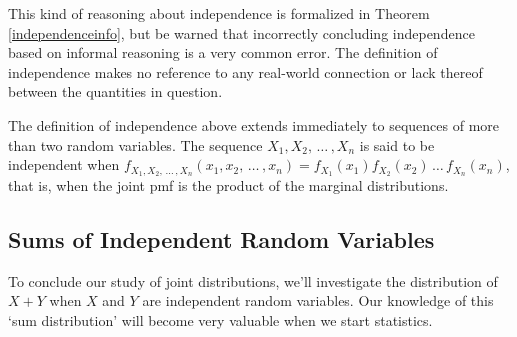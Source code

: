 \par
This kind of reasoning about independence is formalized in Theorem \ref{independenceinfo}, but be warned that incorrectly concluding independence based on informal reasoning is a very common error. The definition of independence makes no reference to any real-world connection or lack thereof between the quantities in question.
\par
The definition of independence above extends immediately to sequences of more than two random variables. The sequence $X_1, X_2,\,\dots\,, X_n$ is said to be independent when $f_{X_1, X_2, \,\dots\, , X_n}(x_1, x_2, \,\dots\, , x_n) = f_{X_1}(x_1)f_{X_2}(x_2) \,\dots\, f_{X_n}(x_n)$, that is, when the joint pmf is the product of the marginal distributions.

\subsection*{Sums of Independent Random Variables}

To conclude our study of joint distributions, we'll investigate the distribution of $X+Y$ when $X$ and $Y$ are independent random variables. Our knowledge of this `sum distribution' will become very valuable when we start statistics.
\par

